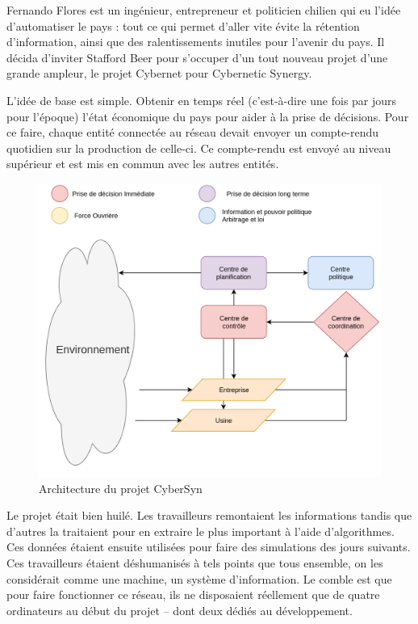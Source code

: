 Fernando Flores est un ingénieur, entrepreneur et politicien chilien qui eu l'idée
d'automatiser le pays : tout ce qui permet d'aller vite évite la rétention d'information,
ainsi que des ralentissements inutiles pour l'avenir du pays.
Il décida d'inviter Stafford Beer pour s'occuper d'un tout nouveau projet d'une grande ampleur,
le projet Cybernet pour Cybernetic Synergy.

L'idée de base est simple. Obtenir en temps réel (c'est-à-dire une fois par jours pour l'époque)
l'état économique du pays pour aider à la prise de décisions.
Pour ce faire, chaque entité connectée au réseau devait envoyer un compte-rendu quotidien sur
la production de celle-ci. Ce compte-rendu est envoyé au niveau supérieur et est mis en commun
avec les autres entités.

\begin{figure}[h!]
  \centering
  \includegraphics[scale=0.20]{media/cybersyn.png}
  \caption{Architecture du projet CyberSyn}
\end{figure}

Le projet était bien huilé. Les travailleurs remontaient les informations
tandis que d'autres la traitaient pour en extraire le plus important à l'aide d'algorithmes.
Ces données étaient ensuite utilisées pour faire des simulations des jours suivants.
Ces travailleurs étaient déshumanisés à tels points que tous ensemble, on les considérait comme une machine, un système d'information.
Le comble est que pour faire fonctionner ce réseau, ils ne disposaient réellement que de quatre ordinateurs au début du projet – dont deux dédiés au développement.

